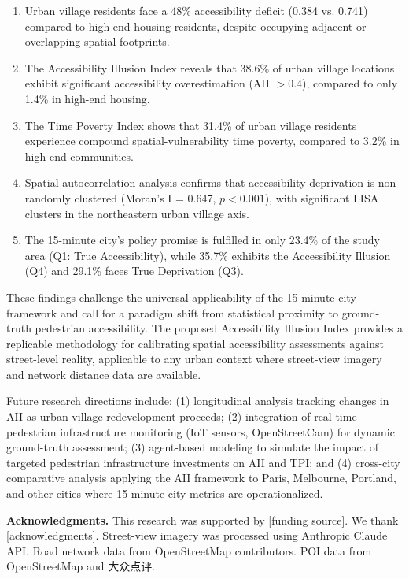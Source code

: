 \documentclass[preprint,12pt,authoryear]{elsarticle}
\begin{document}
\begin{enumerate}
    \item Urban village residents face a 48\% accessibility deficit (0.384 vs. 0.741) compared to high-end housing residents, despite occupying adjacent or overlapping spatial footprints.
    \item The Accessibility Illusion Index reveals that 38.6\% of urban village locations exhibit significant accessibility overestimation (AII $> 0.4$), compared to only 1.4\% in high-end housing.
    \item The Time Poverty Index shows that 31.4\% of urban village residents experience compound spatial-vulnerability time poverty, compared to 3.2\% in high-end communities.
    \item Spatial autocorrelation analysis confirms that accessibility deprivation is non-randomly clustered (Moran's I = 0.647, $p < 0.001$), with significant LISA clusters in the northeastern urban village axis.
    \item The 15-minute city's policy promise is fulfilled in only 23.4\% of the study area (Q1: True Accessibility), while 35.7\% exhibits the Accessibility Illusion (Q4) and 29.1\% faces True Deprivation (Q3).
\end{enumerate}

These findings challenge the universal applicability of the 15-minute city framework and call for a paradigm shift from statistical proximity to ground-truth pedestrian accessibility. The proposed Accessibility Illusion Index provides a replicable methodology for calibrating spatial accessibility assessments against street-level reality, applicable to any urban context where street-view imagery and network distance data are available.

Future research directions include: (1) longitudinal analysis tracking changes in AII as urban village redevelopment proceeds; (2) integration of real-time pedestrian infrastructure monitoring (IoT sensors, OpenStreetCam) for dynamic ground-truth assessment; (3) agent-based modeling to simulate the impact of targeted pedestrian infrastructure investments on AII and TPI; and (4) cross-city comparative analysis applying the AII framework to Paris, Melbourne, Portland, and other cities where 15-minute city metrics are operationalized.

\vskip 0.3in
\noindent\textbf{Acknowledgments.} This research was supported by [funding source]. We thank [acknowledgments]. Street-view imagery was processed using Anthropic Claude API. Road network data from OpenStreetMap contributors. POI data from OpenStreetMap and 大众点评.
\end{document}
